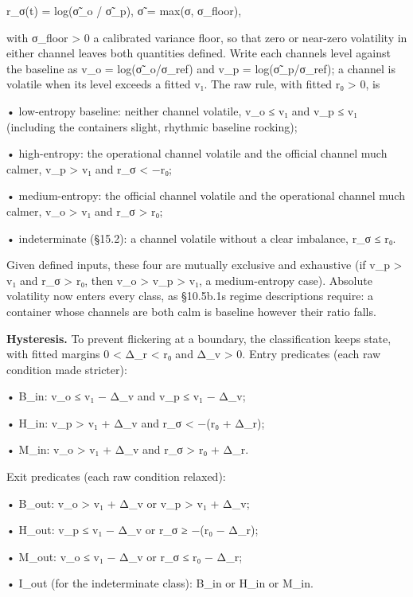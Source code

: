 \documentclass[
]{article}
\begin{document}
r\_σ(t) = log(σ̃\_o / σ̃\_p), σ̃ = max(σ, σ\_floor),

with σ\_floor \textgreater{} 0 a calibrated variance floor, so that zero
or near-zero volatility in either channel leaves both quantities
defined. Write each channel\textquotesingle s level against the baseline
as v\_o = log(σ̃\_o/σ\_ref) and v\_p = log(σ̃\_p/σ\_ref); a channel is
volatile when its level exceeds a fitted v₁. The raw rule, with fitted
r₀ \textgreater{} 0, is

• low-entropy baseline: neither channel volatile, v\_o ≤ v₁ and v\_p ≤
v₁ (including the container\textquotesingle s slight, rhythmic baseline
rocking);

• high-entropy: the operational channel volatile and the official
channel much calmer, v\_p \textgreater{} v₁ and r\_σ \textless{} −r₀;

• medium-entropy: the official channel volatile and the operational
channel much calmer, v\_o \textgreater{} v₁ and r\_σ \textgreater{} r₀;

• indeterminate (§15.2): a channel volatile without a clear imbalance,
\textbar r\_σ\textbar{} ≤ r₀.

Given defined inputs, these four are mutually exclusive and exhaustive
(if v\_p \textgreater{} v₁ and r\_σ \textgreater{} r₀, then v\_o
\textgreater{} v\_p \textgreater{} v₁, a medium-entropy case). Absolute
volatility now enters every class, as §10.5b.1\textquotesingle s regime
descriptions require: a container whose channels are both calm is
baseline however their ratio falls.

\textbf{Hysteresis.} To prevent flickering at a boundary, the
classification keeps state, with fitted margins 0 \textless{} Δ\_r
\textless{} r₀ and Δ\_v \textgreater{} 0. Entry predicates (each raw
condition made stricter):

• B\_in: v\_o ≤ v₁ − Δ\_v and v\_p ≤ v₁ − Δ\_v;

• H\_in: v\_p \textgreater{} v₁ + Δ\_v and r\_σ \textless{} −(r₀ +
Δ\_r);

• M\_in: v\_o \textgreater{} v₁ + Δ\_v and r\_σ \textgreater{} r₀ +
Δ\_r.

Exit predicates (each raw condition relaxed):

• B\_out: v\_o \textgreater{} v₁ + Δ\_v or v\_p \textgreater{} v₁ +
Δ\_v;

• H\_out: v\_p ≤ v₁ − Δ\_v or r\_σ ≥ −(r₀ − Δ\_r);

• M\_out: v\_o ≤ v₁ − Δ\_v or r\_σ ≤ r₀ − Δ\_r;

• I\_out (for the indeterminate class): B\_in or H\_in or M\_in.
\end{document}
